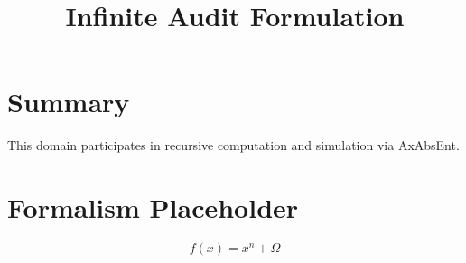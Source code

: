 \documentclass[12pt]{article}
\title{\textbf{Infinite Audit Formulation}}
\begin{document}
\maketitle

\section*{Summary}
This domain participates in recursive computation and simulation via AxAbsEnt.

\section*{Formalism Placeholder}
\[
f(x) = x^n + \Omega
\]
\end{document}

